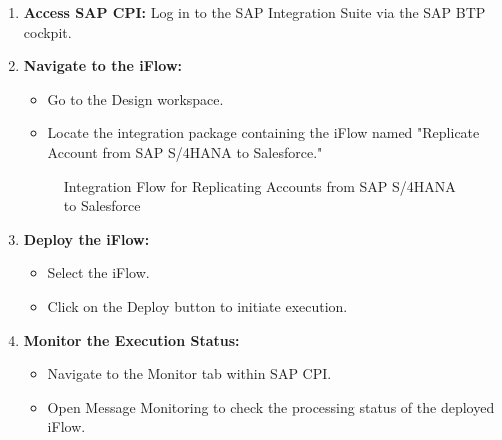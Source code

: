 \begin{enumerate}
    \item \textbf{Access SAP CPI:}
    Log in to the SAP Integration Suite via the SAP BTP cockpit.
    
    \item \textbf{Navigate to the iFlow:}
    \begin{itemize}
        \item Go to the Design workspace.
        \item Locate the integration package containing the iFlow named "Replicate Account from SAP S/4HANA to Salesforce."
    \end{itemize}
    
    \begin{figure}[H]
    \centering
    \caption{Integration Flow for Replicating Accounts from SAP S/4HANA to Salesforce}
    
    \end{figure}
    
    \item \textbf{Deploy the iFlow:}
    \begin{itemize}
        \item Select the iFlow.
        \item Click on the Deploy button to initiate execution.
    \end{itemize}


    \item \textbf{Monitor the Execution Status:}
    \begin{itemize}
        \item Navigate to the Monitor tab within SAP CPI.
        \item Open Message Monitoring to check the processing status of the deployed iFlow.
    \end{itemize}


\end{enumerate}
